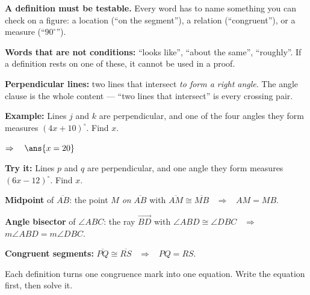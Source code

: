 \documentclass[12pt]{article}
\begin{document}


\begin{formulabox}
\textbf{A definition must be testable.} Every word has to name something you can check on a figure: a location (``on the segment''), a relation (``congruent''), or a measure (``$90^\circ$'').\par
\textbf{Words that are not conditions:} ``looks like'', ``about the same'', ``roughly''. If a definition rests on one of these, it cannot be used in a proof.\par
\textbf{Perpendicular lines:} two lines that intersect \emph{to form a right angle}. The angle clause is the whole content --- ``two lines that intersect'' is every crossing pair.
\end{formulabox}

\begin{examplebox}
\textbf{Example:} \quad Lines $j$ and $k$ are perpendicular, and one of the four angles they form measures $(4x + 10)^\circ$. Find $x$.

$\Rightarrow\quad \ans{x = 20}$
\end{examplebox}

\begin{tryitbox}
\textbf{Try it:} \quad Lines $p$ and $q$ are perpendicular, and one angle they form measures $(6x - 12)^\circ$. Find $x$.\\[2pt]
\end{tryitbox}


\begin{formulabox}
\textbf{Midpoint} of $\overline{AB}$: the point $M$ \emph{on} $\overline{AB}$ with $\overline{AM} \cong \overline{MB}$ \ $\Rightarrow$ \ $AM = MB$.\par
\textbf{Angle bisector} of $\angle ABC$: the ray $\overrightarrow{BD}$ with $\angle ABD \cong \angle DBC$ \ $\Rightarrow$ \ $m\angle ABD = m\angle DBC$.\par
\textbf{Congruent segments:} $\overline{PQ} \cong \overline{RS}$ \ $\Rightarrow$ \ $PQ = RS$.\par
Each definition turns one congruence mark into one equation. Write the equation first, then solve it.
\end{formulabox}
\end{document}
